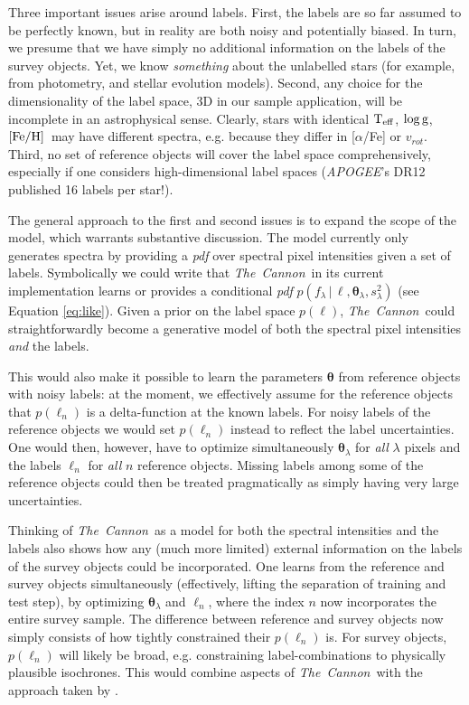 \documentclass[12pt, preprint]{aastex}
\newcommand{\tc}{\textsl{The~Cannon}}
\newcommand{\apogee}{\textsl{APOGEE}}
\newcommand{\set}[1]{\bm{#1}}
\newcommand{\starlabel}{\ell}
\newcommand{\starlabelvec}{\set{\starlabel}}
\newcommand{\given}{\,|\,}
\newcommand{\teff}{\mbox{$\rm T_{eff}$}}
\newcommand{\feh}{\mbox{$\rm [Fe/H]$}}
\newcommand{\logg}{\mbox{$\rm \log g$}}
\begin{document}
Three important issues arise around labels. First, the labels are so far assumed to be perfectly known, 
but in reality are both noisy and potentially biased. In turn, we presume that we
have simply no additional information on the labels of the survey objects. Yet,
we know \emph{something} about the unlabelled stars (for example, from
photometry, and stellar evolution models). Second, any choice for the dimensionality of the label space, 3D in our sample application, will be incomplete in an astrophysical sense. Clearly, stars with identical \teff, \logg, \feh\ may have different spectra, e.g.
because they differ in [$\alpha$/Fe] or $v_{rot}$.
Third, no set of reference objects will cover the label
space comprehensively, especially if one considers high-dimensional label spaces (\apogee 's DR12
published 16 labels per star!). 

The general approach to the first and second issues is to expand the scope of the model, which warrants substantive discussion. The model currently only generates spectra by providing a \textit{pdf}
over spectral pixel intensities given a set of labels.
Symbolically we could write that \tc\ in its current implementation
learns or provides a conditional \textit{pdf}
$p(f_\lambda\given\starlabelvec,\set{\theta}_\lambda, s_\lambda^2)$ (see Equation \ref{eq:like}).
Given a prior on the label space
$p(\starlabelvec)$, \tc\ could straightforwardly become a generative model of both
the spectral pixel intensities \emph{and} the labels.

This would also make it possible to learn the parameters $\set{\theta}$ from
reference objects with noisy labels: at the moment, we effectively 
assume for the reference objects that $p(\starlabelvec_n)$ is a delta-function 
at the known labels. For noisy labels of the reference objects 
we would set $p(\starlabelvec_n)$ instead to reflect the label uncertainties. 
One would then, however, have to optimize simultaneously
$\set{\theta}_\lambda$ for \textit{all} $\lambda$ pixels and the labels $\starlabelvec_n$
for \textit{all} $n$ reference objects. Missing labels among some of the reference
objects could then be treated pragmatically as simply having very large uncertainties.

Thinking of \tc\ as a model for both the spectral intensities and the labels
also shows how any (much more limited) external information on the labels of the survey
objects could be incorporated. One learns from the reference and survey objects
simultaneously (effectively, lifting the separation of training and test step),
by optimizing $\set{\theta}_\lambda$ and $\starlabelvec_n$, where the index $n$ now 
incorporates the entire survey sample. The difference between reference and survey objects
now simply consists of how tightly constrained their $p(\starlabelvec_n)$ is. 
For survey objects, $p(\starlabelvec_n)$ will likely be broad, e.g. constraining label-combinations
to physically plausible isochrones. This would combine aspects of \tc\ with the approach
taken by \cite{SB2014}.
\end{document}
